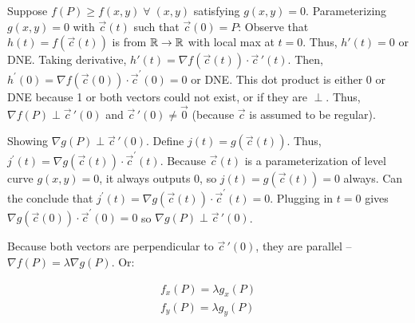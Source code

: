 Suppose $f(P)\geq f(x,y)\;\forall\;(x,y)$ satisfying $g(x,y)=0$. Parameterizing $g(x,y)=0$ with $\vec{c}(t)$
such that $\vec{c}(0)=P$: Observe that $h(t)=f(\vec{c}(t))$ is from $\mathbb{R}\rightarrow\mathbb{R}$ with local max at $t=0$.
Thus, $h'(t)=0$ or DNE. Taking derivative, $h'(t)=\nabla f(\vec{c}(t))\cdot \vec{c}\,'(t)$.
Then, $h^{\prime}(0)=\nabla f(\vec{c}(0)) \cdot \vec{c}^{\prime}(0)=0$ or DNE. This dot product is either 0 or DNE because
1 or both vectors could not exist, or if they are $\perp$. Thus, $\nabla f(P)\perp \vec{c}\,'(0)$ and $\vec{c}\,'(0)\neq \vec{0}$ (because $\vec{c}$ is assumed to be regular).

Showing $\nabla g(P)\perp \vec{c}\,'(0)$. Define $j(t)=g(\vec{c}(t))$. Thus, $j^{\prime}(t)=\nabla g(\vec{c}(t)) \cdot \vec{c}^{\prime}(t)$.
Because $\vec{c}(t)$ is a parameterization of level curve $g(x,y)=0$, it always outputs 0, so $j(t)=g(\vec{c}(t))=0$ always. Can the conclude that
$j^{\prime}(t)=\nabla g(\vec{c}(t)) \cdot \vec{c}^{\prime}(t)=0$. Plugging in $t=0$ gives $\nabla g(\vec{c}(0)) \cdot \vec{c}^{\prime}(0)=0$ so $\nabla g(P)\perp \vec{c}\,'(0)$.

Because both vectors are perpendicular to $\vec{c}\,'(0)$, they are parallel -- $\nabla f(P)=\lambda \nabla g(P)$. Or:

$$\begin{array}{l}
    f_{x}(P)=\lambda g_{x}(P) \\
    f_{y}(P)=\lambda g_{y}(P)
\end{array}$$